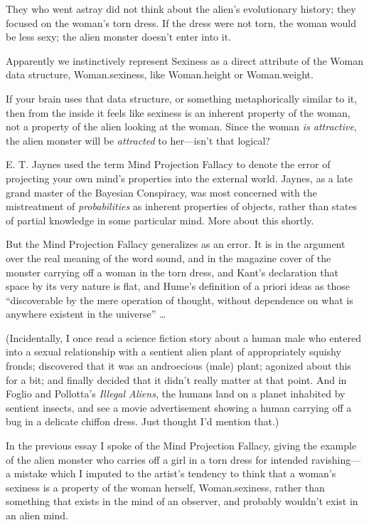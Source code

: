 {
 They who went astray did not think about the
alien's evolutionary history; they focused on the
woman's torn dress. If the dress were not torn, the
woman would be less sexy; the alien monster doesn't
enter into it.}

{
 Apparently we instinctively represent Sexiness as a direct
attribute of the Woman data structure, Woman.sexiness, like
Woman.height or Woman.weight.}

{
 If your brain uses that data structure, or something
metaphorically similar to it, then from the inside it feels like
sexiness is an inherent property of the woman, not a property of the
alien looking at the woman. Since the woman \textit{is attractive}, the
alien monster will be \textit{attracted} to her---isn't
that logical?}

{
 E. T. Jaynes used the term Mind Projection Fallacy to denote the
error of projecting your own mind's properties into the
external world. Jaynes, as a late grand master of the Bayesian
Conspiracy, was most concerned with the mistreatment of
\textit{probabilities} as inherent properties of objects, rather than
states of partial knowledge in some particular mind. More about this
shortly.}

{
 But the Mind Projection Fallacy generalizes as an error. It is in
the argument over the real meaning of the word sound, and in the
magazine cover of the monster carrying off a woman in the torn dress,
and Kant's declaration that space by its very nature is
flat, and Hume's definition of a priori ideas as those
``discoverable by the mere operation of thought,
without dependence on what is anywhere existent in the
universe'' \ldots}

{
 (Incidentally, I once read a science fiction story about a human
male who entered into a sexual relationship with a sentient alien plant
of appropriately squishy fronds; discovered that it was an androecious
(male) plant; agonized about this for a bit; and finally decided that
it didn't really matter at that point. And in Foglio
and Pollotta's \textit{Illegal Aliens}, the humans land
on a planet inhabited by sentient insects, and see a movie
advertisement showing a human carrying off a bug in a delicate chiffon
dress. Just thought I'd mention that.)}

\myendsectiontext


{
 In the previous essay I spoke of the Mind Projection Fallacy,
giving the example of the alien monster who carries off a girl in a
torn dress for intended ravishing---a mistake which I imputed to the
artist's tendency to think that a
woman's sexiness is a property of the woman herself,
Woman.sexiness, rather than something that exists in the mind of an
observer, and probably wouldn't exist in an alien
mind.}

